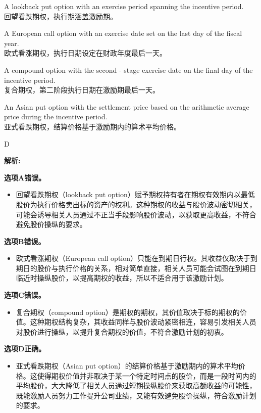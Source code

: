 \documentclass{article}
\newenvironment{explanation}
{\textbf{解析:}\par}
{\par}
\begin{document}
    \begin{choices}
        \item A lookback put option with an exercise period spanning the incentive period.\\
        回望看跌期权，执行期涵盖激励期。
        \item A European call option with an exercise date set on the last day of the fiscal year.\\
        欧式看涨期权，执行日期设定在财政年度最后一天。
        \item A compound option with the second - stage exercise date on the final day of the incentive period.\\
        复合期权，第二阶段执行日期在激励期最后一天。
        \item An Asian put option with the settlement price based on the arithmetic average price during the incentive period.\\
        亚式看跌期权，结算价格基于激励期内的算术平均价格。
    \end{choices}
    
    \begin{correctanswer}
    D
    \end{correctanswer}
    
    \begin{explanation}
    \textbf{选项A错误。}
    \begin{itemize}
    \item 回望看跌期权（lookback put option）赋予期权持有者在期权有效期内以最低股价为执行价格卖出标的资产的权利。这种期权的收益与股价波动密切相关，可能会诱导相关人员通过不正当手段影响股价波动，以获取更高收益，不符合避免股价操纵的要求。
    \end{itemize}
    \textbf{选项B错误。}
    \begin{itemize}
    \item 欧式看涨期权（European call option）只能在到期日行权。其收益仅取决于到期日的股价与执行价格的关系，相对简单直接，相关人员可能会试图在到期日临近时操纵股价，以提高期权的收益，所以不适合用于该激励计划。 
    \end{itemize}
    \textbf{选项C错误。}
    \begin{itemize}
    \item 复合期权（compound option）是期权的期权，其价值取决于标的期权的价值。这种期权结构复杂，其收益同样与股价波动紧密相连，容易引发相关人员对股价进行操纵，以提升复合期权的价值，不符合激励计划的初衷。 
    \end{itemize}
    \textbf{选项D正确。}
    \begin{itemize}
    \item 亚式看跌期权（Asian put option）的结算价格基于激励期内的算术平均价格。这使得期权价值并非取决于某一个特定时间点的股价，而是一段时间内的平均股价，大大降低了相关人员通过短期操纵股价来获取高额收益的可能性，既能激励人员努力工作提升公司业绩，又能有效避免股价操纵，符合激励计划的要求。 
    \end{itemize}
    \end{explanation}
    
\end{document}
